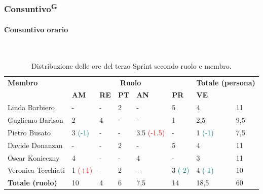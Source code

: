 \documentclass[8pt]{article}
\newcommand{\glossterm}[1]{#1\textsuperscript{G}} %
\newcommand{\subsubsubsection}[1]{\paragraph{#1}\mbox{}\\}
\begin{document}
\subsubsection{\glossterm{Consuntivo}}
\subsubsubsection{Consuntivo orario}
\begin{table}[ht!]
	\centering
	\begin{tabular}{p{3cm} p{1.4cm} p{1.6cm} p{1.7cm} p{1.4cm} p{1.4cm} p{1.5cm} p{2cm}}
		\toprule
        \textbf{Membro} & \multicolumn{5}{c}{\textbf{Ruolo}} & \multicolumn{2}{r}{\textbf{Totale (persona)}}\\
		& \textbf{AM} & \textbf{RE} & \textbf{PT} & \textbf{AN} & \textbf{PR} & \textbf{VE}\\
		\midrule
        Linda Barbiero     & - & - & 2 & -   & 5 & 4 & 11 \\
        Gugliemo Barison   & 2 & 4 & - & -   & 1 & 2,5 & 9,5 \\
        Pietro Busato      & 3 \textcolor{teal}{(-1)} & - & - & 3.5
        \textcolor{red}{(-1.5)} & - & 1 \textcolor{teal}{(-1)} & 7,5 \\
        Davide Donanzan    & - & - & 2 & -   & 5 & 4 & 11 \\
        Oscar Konieczny    & 4 & - & - & 4   & - & 3 & 11 \\
        Veronica Tecchiati & 1 \textcolor{red}{(+1)} & -  & 2 & -   & 3 \textcolor{teal}{(-2)} & 4
        \textcolor{teal}{(-1)}  & 10 \\
        \midrule
        \textbf{Totale (ruolo)} & 10 & 4 & 6 & 7,5 & 14 & 18,5 & 60 \\
		\bottomrule
	\end{tabular}
	\caption{Distribuzione delle ore del terzo Sprint secondo ruolo e membro.}
	\label{table:Distribuzione delle ore del terzo Sprint secondo ruolo e membr}
\end{table}
\end{document}
